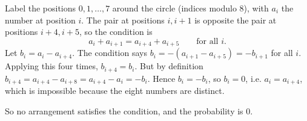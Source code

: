Label the positions \(0,1,\dots,7\) around the circle (indices modulo \(8\)), with \(a_i\) the number at position \(i\). The pair at positions \(i,i+1\) is opposite the pair at positions \(i+4,i+5\), so the condition is
\[
a_i+a_{i+1}=a_{i+4}+a_{i+5}\qquad\text{for all }i .
\]
Let \(b_i=a_i-a_{i+4}\). The condition says \(b_i=-(a_{i+1}-a_{i+5})=-b_{i+1}\) for all \(i\). Applying this four times, \(b_{i+4}=b_i\). But by definition \(b_{i+4}=a_{i+4}-a_{i+8}=a_{i+4}-a_i=-b_i\). Hence \(b_i=-b_i\), so \(b_i=0\), i.e. \(a_i=a_{i+4}\), which is impossible because the eight numbers are distinct.

So no arrangement satisfies the condition, and the probability is \(\boxed{0}\).
